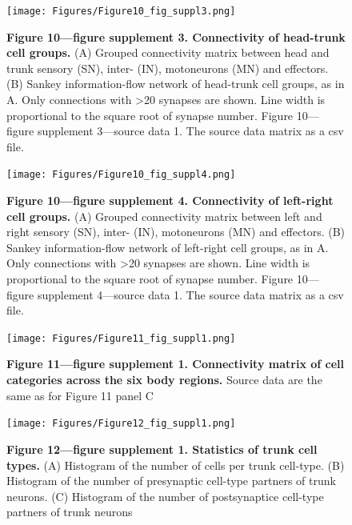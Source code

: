 \documentclass[
  11pt,
]{article}
\begin{document}
\begin{figure}[H]

{\centering \texttt{[image: Figures/Figure10\_fig\_suppl3.png]}

}

\caption{\textbf{Figure 10---figure supplement 3. Connectivity of
head-trunk cell groups.} (A) Grouped connectivity matrix between head
and trunk sensory (SN), inter- (IN), motoneurons (MN) and effectors. (B)
Sankey information-flow network of head-trunk cell groups, as in A. Only
connections with \textgreater20 synapses are shown. Line width is
proportional to the square root of synapse number. Figure 10---figure
supplement 3---source data 1. The source data matrix as a csv file.}

\end{figure}%

\begin{figure}[H]

{\centering \texttt{[image: Figures/Figure10\_fig\_suppl4.png]}

}

\caption{\textbf{Figure 10---figure supplement 4. Connectivity of
left-right cell groups.} (A) Grouped connectivity matrix between left
and right sensory (SN), inter- (IN), motoneurons (MN) and effectors. (B)
Sankey information-flow network of left-right cell groups, as in A. Only
connections with \textgreater20 synapses are shown. Line width is
proportional to the square root of synapse number. Figure 10---figure
supplement 4---source data 1. The source data matrix as a csv file.}

\end{figure}%

\begin{figure}[H]

{\centering \texttt{[image: Figures/Figure11\_fig\_suppl1.png]}

}

\caption{\textbf{Figure 11---figure supplement 1. Connectivity matrix of
cell categories across the six body regions. } Source data are the same
as for Figure 11 panel C}

\end{figure}%

\begin{figure}[H]

{\centering \texttt{[image: Figures/Figure12\_fig\_suppl1.png]}

}

\caption{\textbf{Figure 12---figure supplement 1. Statistics of trunk
cell types. } (A) Histogram of the number of cells per trunk cell-type.
(B) Histogram of the number of presynaptic cell-type partners of trunk
neurons. (C) Histogram of the number of postsynaptice cell-type partners
of trunk neurons}

\end{figure}%
\end{document}
